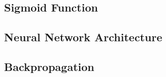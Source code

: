 \subsection{Sigmoid Function}

\subsection{Neural Network Architecture}

\subsection{Backpropagation}